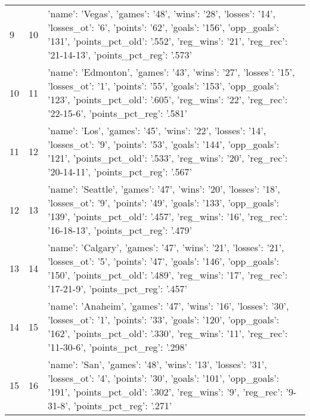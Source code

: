 \begin{tabular}{lrl}
9 & 10 & {'name': 'Vegas', 'games': '48', 'wins': '28', 'losses': '14', 'losses_ot': '6', 'points': '62', 'goals': '156', 'opp_goals': '131', 'points_pct_old': '.552', 'reg_wins': '21', 'reg_rec': '21-14-13', 'points_pct_reg': '.573'} \\
10 & 11 & {'name': 'Edmonton', 'games': '43', 'wins': '27', 'losses': '15', 'losses_ot': '1', 'points': '55', 'goals': '153', 'opp_goals': '123', 'points_pct_old': '.605', 'reg_wins': '22', 'reg_rec': '22-15-6', 'points_pct_reg': '.581'} \\
11 & 12 & {'name': 'Los', 'games': '45', 'wins': '22', 'losses': '14', 'losses_ot': '9', 'points': '53', 'goals': '144', 'opp_goals': '121', 'points_pct_old': '.533', 'reg_wins': '20', 'reg_rec': '20-14-11', 'points_pct_reg': '.567'} \\
12 & 13 & {'name': 'Seattle', 'games': '47', 'wins': '20', 'losses': '18', 'losses_ot': '9', 'points': '49', 'goals': '133', 'opp_goals': '139', 'points_pct_old': '.457', 'reg_wins': '16', 'reg_rec': '16-18-13', 'points_pct_reg': '.479'} \\
13 & 14 & {'name': 'Calgary', 'games': '47', 'wins': '21', 'losses': '21', 'losses_ot': '5', 'points': '47', 'goals': '146', 'opp_goals': '150', 'points_pct_old': '.489', 'reg_wins': '17', 'reg_rec': '17-21-9', 'points_pct_reg': '.457'} \\
14 & 15 & {'name': 'Anaheim', 'games': '47', 'wins': '16', 'losses': '30', 'losses_ot': '1', 'points': '33', 'goals': '120', 'opp_goals': '162', 'points_pct_old': '.330', 'reg_wins': '11', 'reg_rec': '11-30-6', 'points_pct_reg': '.298'} \\
15 & 16 & {'name': 'San', 'games': '48', 'wins': '13', 'losses': '31', 'losses_ot': '4', 'points': '30', 'goals': '101', 'opp_goals': '191', 'points_pct_old': '.302', 'reg_wins': '9', 'reg_rec': '9-31-8', 'points_pct_reg': '.271'} \\
\end{tabular}


